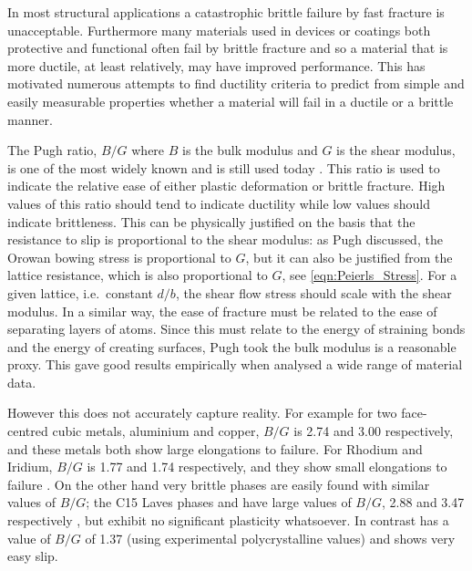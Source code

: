 

In most structural applications a catastrophic brittle failure by fast fracture is unacceptable. Furthermore many materials used in devices or coatings both protective and functional often fail by brittle fracture and so a material that is more ductile, at least relatively, may have improved performance. This has motivated numerous attempts to find ductility criteria to predict from simple and easily measurable properties whether a material will fail in a ductile or a brittle manner.

The Pugh ratio, $B/G$ where $B$ is the bulk modulus and $G$ is the shear modulus, is one of the most widely known and is still used today \cite{Sangiovanni2011,Aryal2014,Wang2015,Hu2016,Zhuang2017}. This ratio is used to indicate the relative ease of either plastic deformation or brittle fracture. High values of this ratio should tend to indicate ductility while low values should indicate brittleness. This can be physically justified on the basis that the resistance to slip is proportional to the shear modulus: as Pugh discussed, the Orowan bowing stress is proportional to $G$, but it can also be justified from the lattice resistance, which is also proportional to $G$, see \ref{eqn:Peierls_Stress}. For a given lattice, i.e.\ constant $d/b$, the shear flow stress should scale with the shear modulus. In a similar way, the ease of fracture must be related to the ease of separating layers of atoms. Since this must relate to the energy of straining bonds and the energy of creating surfaces, Pugh took the bulk modulus is a reasonable proxy. This gave good results empirically when \citet{Pugh1954} analysed a wide range of material data.

However this does not accurately capture reality. For example for two face-centred cubic metals, aluminium and copper, $B/G$ is 2.74 and 3.00 respectively, and these metals both show large elongations to failure. For Rhodium and Iridium, $B/G$ is 1.77 and 1.74 respectively, and they show small elongations to failure \cite{Pugh1954}. On the other hand very brittle phases are easily found with similar values of $B/G$; the C15 Laves phases \cite{Stein2004,Stein2005}  and  have large values of $B/G$, 2.88 and 3.47 respectively \cite{Chu1995}, but exhibit no significant plasticity whatsoever. In contrast  has a value of $B/G$ of 1.37 (using experimental polycrystalline values) \cite{Barsoum2011} and shows very easy slip.



